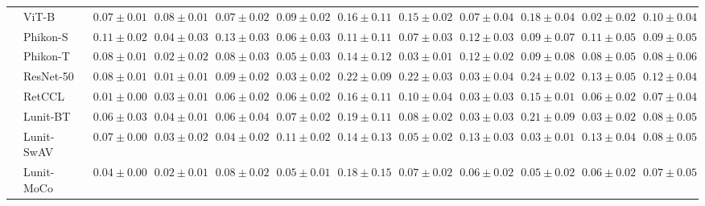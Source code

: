 \begin{tabular}{ll|cccc|c|cccc|c}
 & ViT-B~\cite{kolesnikov2021image} & $0.07 \pm 0.01$ & $0.08 \pm 0.01$ & $0.07 \pm 0.02$ & $0.09 \pm 0.02$ & $0.16 \pm 0.11$ & $0.15 \pm 0.02$ & $0.07 \pm 0.04$ & $0.18 \pm 0.04$ & $0.02 \pm 0.02$ & $0.10 \pm 0.04$ \\
 & Phikon-S~\cite{filiot2023scaling} & $0.11 \pm 0.02$ & $0.04 \pm 0.03$ & $0.13 \pm 0.03$ & $0.06 \pm 0.03$ & $0.11 \pm 0.11$ & $0.07 \pm 0.03$ & $0.12 \pm 0.03$ & $0.09 \pm 0.07$ & $0.11 \pm 0.05$ & $0.09 \pm 0.05$ \\
 & Phikon-T~\cite{filiot2023scaling} & $0.08 \pm 0.01$ & $0.02 \pm 0.02$ & $0.08 \pm 0.03$ & $0.05 \pm 0.03$ & $0.14 \pm 0.12$ & $0.03 \pm 0.01$ & $0.12 \pm 0.02$ & $0.09 \pm 0.08$ & $0.08 \pm 0.05$ & $0.08 \pm 0.06$ \\
 & ResNet-50~\cite{he2015deep} & $0.08 \pm 0.01$ & $\mathbf{0.01 \pm 0.01}$ & $0.09 \pm 0.02$ & $0.03 \pm 0.02$ & $0.22 \pm 0.09$ & $0.22 \pm 0.03$ & $0.03 \pm 0.04$ & $0.24 \pm 0.02$ & $0.13 \pm 0.05$ & $0.12 \pm 0.04$ \\
 & RetCCL~\cite{wang2023retccl} & $0.01 \pm 0.00$ & $0.03 \pm 0.01$ & $0.06 \pm 0.02$ & $0.06 \pm 0.02$ & $0.16 \pm 0.11$ & $0.10 \pm 0.04$ & $0.03 \pm 0.03$ & $0.15 \pm 0.01$ & $0.06 \pm 0.02$ & $0.07 \pm 0.04$ \\
 & Lunit-BT~\cite{kang2023benchmarking} & $0.06 \pm 0.03$ & $0.04 \pm 0.01$ & $0.06 \pm 0.04$ & $0.07 \pm 0.02$ & $0.19 \pm 0.11$ & $0.08 \pm 0.02$ & $0.03 \pm 0.03$ & $0.21 \pm 0.09$ & $0.03 \pm 0.02$ & $0.08 \pm 0.05$ \\
 & Lunit-SwAV~\cite{kang2023benchmarking} & $0.07 \pm 0.00$ & $0.03 \pm 0.02$ & $0.04 \pm 0.02$ & $0.11 \pm 0.02$ & $0.14 \pm 0.13$ & $0.05 \pm 0.02$ & $0.13 \pm 0.03$ & $0.03 \pm 0.01$ & $0.13 \pm 0.04$ & $0.08 \pm 0.05$ \\
 & Lunit-MoCo~\cite{kang2023benchmarking} & $0.04 \pm 0.00$ & $0.02 \pm 0.01$ & $0.08 \pm 0.02$ & $0.05 \pm 0.01$ & $0.18 \pm 0.15$ & $0.07 \pm 0.02$ & $0.06 \pm 0.02$ & $0.05 \pm 0.02$ & $0.06 \pm 0.02$ & $0.07 \pm 0.05$ \\
\cline{1-12}
\bottomrule
\end{tabular}
